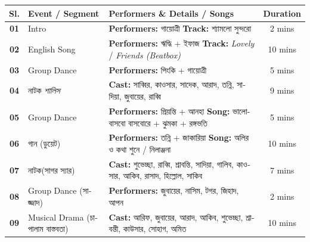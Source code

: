 \documentclass[11pt,a4paper]{article}
\begin{document}
\begin{table}[htbp]
\centering
\small
\renewcommand{\arraystretch}{1.3}
\begin{tabularx}{\textwidth}{c p{3.2cm} X c}
\toprule
\textbf{Sl.} & \textbf{Event / Segment} & \textbf{Performers \& Details / Songs} & \textbf{Duration} \\
\midrule

\textbf{01} & 
Intro & 
\textbf{Performers:}
\textbengali{গায়োত্রী} \newline
\textbf{Track:}
\textbengali{শ্যামলো সুন্দরো} 
& 
2 mins \\

\textbf{02} & 
English Song & 
\textbf{Performers:} \textbengali{ঋদ্ধি + ইফাজ} \newline
\textbf{Track:} \textit{Lovely} / \textit{Friends (Beatbox)} & 
10 mins \\

\textbf{03} & 
Group Dance & 
\textbf{Performers:} \textbengali{পিংকি + গায়োত্রী} & 
5 mins \\

\textbf{04} & 
\textbengali{নাটক} \newline
\textit{\textbengali{শালিস}} & 
\textbf{Cast:} \textbengali{সাব্বির, কাওসার, সাদেক, আরাদ, তন্নি, সাদিয়া, জুবায়ের, রাব্বি} & 
9 mins \\

\textbf{05} & 
Group Dance & 
\textbf{Performers:} \textbengali{প্রিয়ন্তি + আনহা} \newline
\textbf{Song:} \textbengali{ভালোবাসবো বাসবোরে + ঝুমকা + রঙ্গভতি} & 
5 mins \\

\textbf{06} & 
\textbengali{গান (ডুয়েট)} & 
\textbf{Performers:} \textbengali{তন্নি + জাকারিয়া} \newline
\textbf{Song:} \textbengali{অলির ও কথা শুনে / নিলাঞ্জনা} & 
10 mins \\

\textbf{07} & 
\textbengali{নাটক(সাগর স্যার)} & 
\textbf{Cast:} \textbengali{শুভেচ্ছা, রাব্বি, শ্রাবন্তি, সাদিয়া, গালিব, কাওসার, আকিব, রাসাদ, হিল্লোল, সাকিব} & 
7 mins \\

\textbf{08} & 
Group Dance \textbengali{(সাজ্জাদ)} & 
\textbf{Performers:} \textbengali{জুবায়ের, নাসিম, টগর, জিহাদ, আপন} & 
2 mins \\

\textbf{09} & 
Musical Drama \newline
\textbengali{(চাপালাম বাস্তবতা)} & 
\textbf{Cast:} \textbengali{আরিফ, জুবায়ের, আরাদ, আকিব, শুভেচ্ছা, শ্রাবন্তী, কাউসার, সোহাগ, অমিত} & 
10 mins \\


\end{tabularx}
\end{table}
\end{document}
